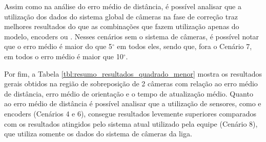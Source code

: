 \documentclass[acronym, symbols, table]{fei}
\begin{document}
	Assim como na análise do erro médio de distância, é possível analisar que a utilização dos dados do sistema global de câmeras na fase de correção traz melhores resultados do que as combinações que fazem utilização apenas do modelo, encoders ou . Nesses cenários sem o sistema de câmeras, é possível notar que o erro médio é maior do que 5$^\circ$ em todos eles, sendo que, fora o Cenário 7, em todos o erro médio é maior que 10$^\circ$.

	Por fim, a Tabela \ref{tbl:resumo_resultados_quadrado_menor} mostra os resultados gerais obtidos na região de sobreposição de 2 câmeras com relação ao erro médio de distância, erro médio de orientação e o tempo de atualização médio. Quanto ao erro médio de distância é possível analisar que a utilização de sensores, como  e encoders (Cenários 4 e 6), consegue resultados levemente superiores comparados com os resultados atingidos pelo sistema atual utilizado pela equipe (Cenário 8), que utiliza somente os dados do sistema de câmeras da liga.
\end{document}
